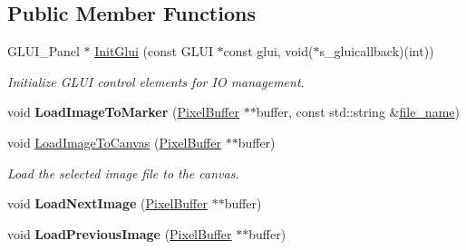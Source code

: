 \subsection*{Public Member Functions}
\begin{DoxyCompactItemize}
\item 
G\+L\+U\+I\+\_\+\+Panel $\ast$ \hyperlink{classimage__tools_1_1MIAIOManager_a02267caa7b3b9746d45e5f89138c1376}{Init\+Glui} (const G\+L\+UI $\ast$const glui, void($\ast$s\+\_\+gluicallback)(int))
\begin{DoxyCompactList}\small\item\em Initialize G\+L\+UI control elements for IO management. \end{DoxyCompactList}\item 
void {\bfseries Load\+Image\+To\+Marker} (\hyperlink{classimage__tools_1_1PixelBuffer}{Pixel\+Buffer} $\ast$$\ast$buffer, const std\+::string \&\hyperlink{classimage__tools_1_1IOManager_a667da573afc3fc0977408a0bf669f448}{file\+\_\+name})\hypertarget{classimage__tools_1_1MIAIOManager_a816c601b3bea683b97f96cfe46802f6c}{}\label{classimage__tools_1_1MIAIOManager_a816c601b3bea683b97f96cfe46802f6c}

\item 
void \hyperlink{classimage__tools_1_1MIAIOManager_a0017f31cc3412d895641b46e526222ff}{Load\+Image\+To\+Canvas} (\hyperlink{classimage__tools_1_1PixelBuffer}{Pixel\+Buffer} $\ast$$\ast$buffer)\hypertarget{classimage__tools_1_1MIAIOManager_a0017f31cc3412d895641b46e526222ff}{}\label{classimage__tools_1_1MIAIOManager_a0017f31cc3412d895641b46e526222ff}

\begin{DoxyCompactList}\small\item\em Load the selected image file to the canvas. \end{DoxyCompactList}\item 
void {\bfseries Load\+Next\+Image} (\hyperlink{classimage__tools_1_1PixelBuffer}{Pixel\+Buffer} $\ast$$\ast$buffer)\hypertarget{classimage__tools_1_1MIAIOManager_a0a9e96f4c4d3b581dcbabeae6c602c7a}{}\label{classimage__tools_1_1MIAIOManager_a0a9e96f4c4d3b581dcbabeae6c602c7a}

\item 
void {\bfseries Load\+Previous\+Image} (\hyperlink{classimage__tools_1_1PixelBuffer}{Pixel\+Buffer} $\ast$$\ast$buffer)\hypertarget{classimage__tools_1_1MIAIOManager_af6b6300a284f8ea35f57a20fdffefcb6}{}\label{classimage__tools_1_1MIAIOManager_af6b6300a284f8ea35f57a20fdffefcb6}


\end{DoxyCompactItemize}
